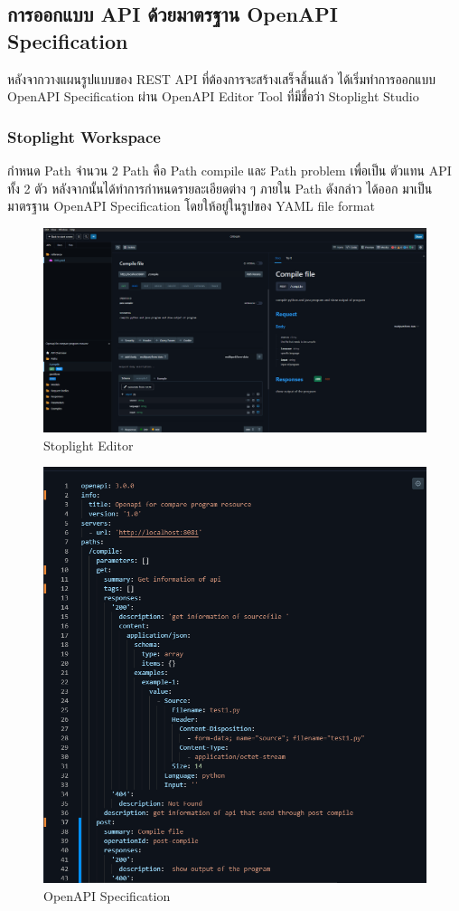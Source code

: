 \subsection{การออกแบบ API ด้วยมาตรฐาน OpenAPI Specification}
หลังจากวางแผนรูปแบบของ REST API ที่ต้องการจะสร้างเสร็จสิ้นแล้ว ได้เริ่มทําการออกแบบ
OpenAPI Specification ผ่าน OpenAPI Editor Tool ที่มีชื่อว่า Stoplight Studio
\subsubsection{Stoplight Workspace}
    กําหนด Path จํานวน 2 Path คือ Path compile และ Path problem เพื่อเป็น
ตัวแทน API ทั้ง 2 ตัว หลังจากนั้นได้ทําการกําหนดรายละเอียดต่าง ๆ ภายใน Path ดังกล่าว ได้ออก
มาเป็นมาตรฐาน OpenAPI Specification โดยให้อยู่ในรูปของ YAML file format
        \begin{figure}[H]
            \centering
                \centering
                \includegraphics[width=5in]{latex/figures/stoplight.png}
            \caption{Stoplight Editor}
        \end{figure}
        \begin{figure}[H]
            \centering
                \centering
                \includegraphics[width=5in]{latex/figures/OAS.png}
            \caption{OpenAPI Specification}
        \end{figure}

